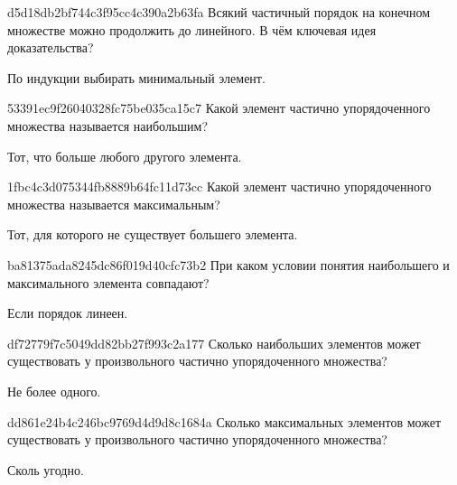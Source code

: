 \begin{note}{d5d18db2bf744c3f95cc4c390a2b63fa}
    Всякий частичный порядок на конечном множестве можно продолжить до линейного.
    В чём ключевая идея доказательства?

    \begin{cloze}{1}
        По индукции выбирать минимальный элемент.
    \end{cloze}
\end{note}

\begin{note}{53391ec9f26040328fc75be035ca15c7}
    Какой элемент частично упорядоченного множества называется наибольшим?

    \begin{cloze}{1}
        Тот, что больше любого другого элемента.
    \end{cloze}
\end{note}

\begin{note}{1fbc4c3d075344fb8889b64fc11d73cc}
    Какой элемент частично упорядоченного множества называется максимальным?

    \begin{cloze}{1}
        Тот, для которого не существует большего элемента.
    \end{cloze}
\end{note}

\begin{note}{ba81375ada8245dc86f019d40cfc73b2}
    При каком условии понятия наибольшего и максимального элемента совпадают?

    \begin{cloze}{1}
        Если порядок линеен.
    \end{cloze}
\end{note}

\begin{note}{df72779f7c5049dd82bb27f993c2a177}
    Сколько наибольших элементов может существовать у произвольного частично упорядоченного множества?

    \begin{cloze}{1}
        Не более одного.
    \end{cloze}
\end{note}

\begin{note}{dd861e24b4c246bc9769d4d9d8c1684a}
    Сколько максимальных элементов может существовать у произвольного частично упорядоченного множества?

    \begin{cloze}{1}
        Сколь угодно.
    \end{cloze}
\end{note}

